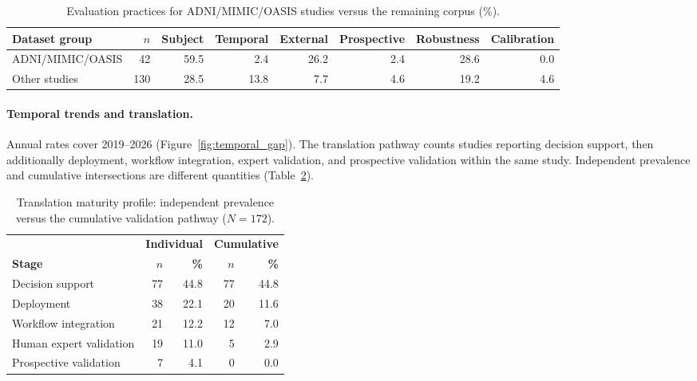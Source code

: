 \documentclass[11pt]{article}
\theoremstyle{plain}
\theoremstyle{definition}
\theoremstyle{remark}
\begin{document}
\begin{table}[!t]
\centering
\small
\setlength{\tabcolsep}{4pt}
\renewcommand{\arraystretch}{0.95}
\begin{tabular*}{\textwidth}{@{\extracolsep{\fill}}lrrrrrrr@{}}
\toprule
\rowcolor{gray!18}
\textbf{Dataset group} & \textbf{$n$} & \textbf{Subject} & \textbf{Temporal} & \textbf{External} & \textbf{Prospective} & \textbf{Robustness} & \textbf{Calibration} \\
\midrule
ADNI/MIMIC/OASIS & 42  & 59.5 & 2.4  & 26.2 & 2.4 & 28.6 & 0.0 \\
Other studies    & 130 & 28.5 & 13.8 & 7.7  & 4.6 & 19.2 & 4.6 \\
\bottomrule
\end{tabular*}
\caption{Evaluation practices for ADNI/MIMIC/OASIS studies versus the remaining corpus (\%).}
\label{tab:benchmark_concentration}
\end{table}

\paragraph{Temporal trends and translation.} Annual rates cover 2019--2026 (Figure~\ref{fig:temporal_gap}). The translation pathway counts studies reporting decision support, then additionally deployment, workflow integration, expert validation, and prospective validation within the same study. Independent prevalence and cumulative intersections are different quantities (Table~\ref{tab:translation_maturity}).

\begin{table}[!t]
\centering
\small
\setlength{\tabcolsep}{2.8pt}
\renewcommand{\arraystretch}{0.92}
\begin{tabular}{p{2.6cm}rr|rr}
\toprule
\rowcolor{gray!18}
& \multicolumn{2}{c|}{\textbf{Individual}} & \multicolumn{2}{c}{\textbf{Cumulative}} \\
\textbf{Stage} & \textbf{$n$} & \textbf{\%} & \textbf{$n$} & \textbf{\%} \\
\midrule
Decision support        & 77 & 44.8 & 77 & 44.8 \\
Deployment              & 38 & 22.1 & 20 & 11.6 \\
Workflow integration    & 21 & 12.2 & 12 & 7.0 \\
Human expert validation & 19 & 11.0 & 5  & 2.9 \\
Prospective validation  & 7  & 4.1  & 0  & 0.0 \\
\bottomrule
\end{tabular}
\caption{Translation maturity profile: independent prevalence versus the cumulative validation pathway ($N=172$).}
\label{tab:translation_maturity}
\end{table}
\end{document}
